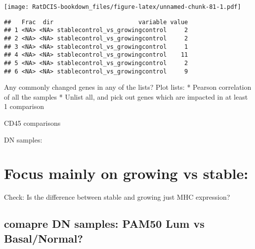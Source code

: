 \documentclass[
]{book}
\begin{document}
\texttt{[image: RatDCIS-bookdown\_files/figure-latex/unnamed-chunk-81-1.pdf]}

\begin{verbatim}
##   Frac  dir                        variable value
## 1 <NA> <NA> stablecontrol_vs_growingcontrol     2
## 2 <NA> <NA> stablecontrol_vs_growingcontrol     2
## 3 <NA> <NA> stablecontrol_vs_growingcontrol     1
## 4 <NA> <NA> stablecontrol_vs_growingcontrol    11
## 5 <NA> <NA> stablecontrol_vs_growingcontrol     2
## 6 <NA> <NA> stablecontrol_vs_growingcontrol     9
\end{verbatim}

Any commonly changed genes in any of the lists?
Plot lists:
* Pearson correlation of all the samples
* Unlist all, and pick out genes which are impacted in at least 1 comparison

CD45 comparisons

DN samples:

\hypertarget{focus-mainly-on-growing-vs-stable}{%
\section{Focus mainly on growing vs stable:}\label{focus-mainly-on-growing-vs-stable}}

Check: Is the difference between stable and growing just MHC expression?

\hypertarget{comapre-dn-samples-pam50-lum-vs-basalnormal}{%
\subsection{comapre DN samples: PAM50 Lum vs Basal/Normal?}\label{comapre-dn-samples-pam50-lum-vs-basalnormal}}

  
\end{document}
